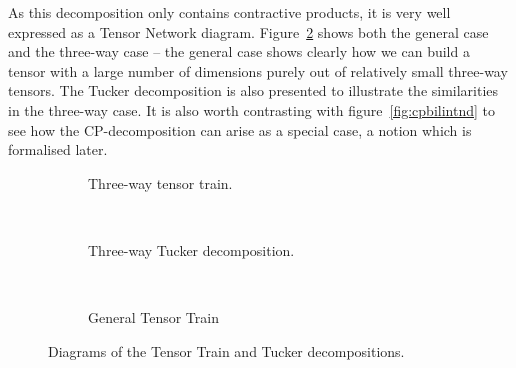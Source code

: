 {As this decomposition only contains contractive products, it is very well expressed as a Tensor
Network diagram. Figure~\ref{fig:tttnds} shows both the general case and the three-way case --
the general case shows clearly how we can build a tensor with a large number of dimensions purely
out of relatively small three-way tensors. The Tucker decomposition is also presented to illustrate
the similarities in the three-way case. It is also worth contrasting with figure~\ref{fig:cpbilintnd}
to see how the CP-decomposition can arise as a special case, a notion which is formalised later.

\begin{figure}
	\centering
	\begin{subfigure}[t]{0.45\textwidth}
		\caption{Three-way tensor train.}
	\end{subfigure}~
	\begin{subfigure}[t]{0.45\textwidth}
		\caption{Three-way Tucker decomposition.}
		\label{fig:tuckertnd}
	\end{subfigure}\\
	\begin{subfigure}[t]{0.45\textwidth}
		\caption{General Tensor Train}
	\end{subfigure}
	\caption{Diagrams of the Tensor Train and Tucker decompositions.}
	\label{fig:tttnds}
\end{figure}

}
